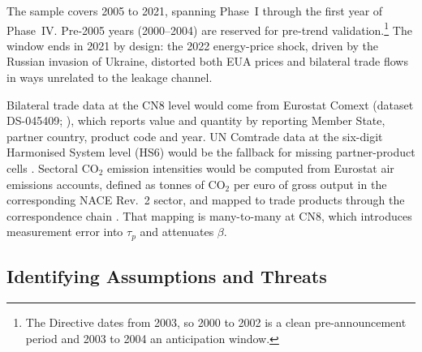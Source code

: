The sample covers 2005 to 2021, spanning Phase~I through the first year of Phase~IV. Pre-2005 years (2000--2004) are reserved for pre-trend validation.\footnote{The Directive dates from 2003, so 2000 to 2002 is a clean pre-announcement period and 2003 to 2004 an anticipation window.} The window ends in 2021 by design: the 2022 energy-price shock, driven by the Russian invasion of Ukraine, distorted both EUA prices and bilateral trade flows in ways unrelated to the leakage channel.

Bilateral trade data at the CN8 level would come from Eurostat Comext (dataset DS-045409; \citealp{comext}), which reports value and quantity by reporting Member State, partner country, product code and year. UN Comtrade data at the six-digit Harmonised System level (HS6) would be the fallback for missing partner-product cells \citep{comtrade}. Sectoral CO$_2$ emission intensities would be computed from Eurostat air emissions accounts, defined as tonnes of CO$_2$ per euro of gross output in the corresponding NACE Rev.~2 sector, and mapped to trade products through the correspondence chain \citep{ramon}. That mapping is many-to-many at CN8, which introduces measurement error into $\tau_p$ and attenuates $\beta$.

\subsection{Identifying Assumptions and Threats}

